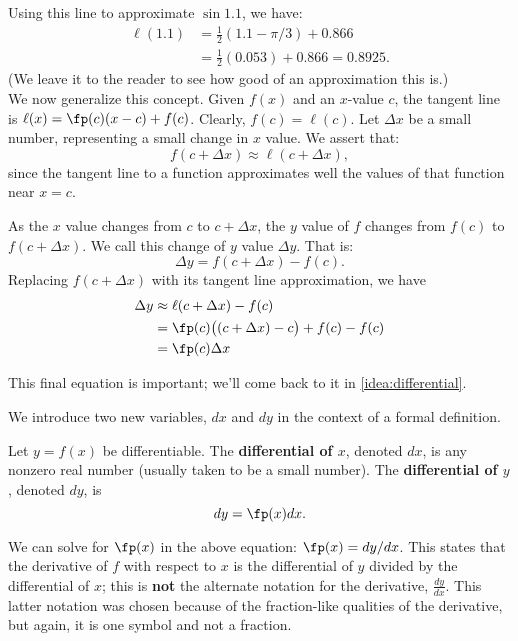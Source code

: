 Using this line to approximate $\sin 1.1$, we have:
\begin{align*}
	\ell(1.1) &= \frac12(1.1-\pi/3)+0.866 \\
					&= \frac12(0.053)+0.866 = 0.8925.
\end{align*}
(We leave it to the reader to see how good of an approximation this is.)\\

We now generalize this concept. Given $f(x)$ and an $x$-value $c$,  the tangent line is $\ell(x) = \fp(c)(x-c)+f(c)$. Clearly, $f(c) = \ell(c)$. Let $\Delta x$ be a small number, representing a small change in $x$ value. We assert that:
\[f(c+\Delta x) \approx \ell(c+\Delta x),\]
since the tangent line to a function approximates well the values of that function near $x=c$. 

As the $x$ value changes from $c$ to $c+\Delta x$, the $y$ value of $f$ changes from $f(c)$ to $f(c+\Delta x)$. We call this change of $y$ value $\Delta y$. That is:
\[\Delta y = f(c+\Delta x)-f(c).\]
Replacing $f(c+\Delta x)$ with its tangent line approximation, we have 
\begin{align}
	\Delta y &\approx \ell(c+\Delta x) - f(c) \notag\\
	&= \fp(c)\bigl((c+\Delta x)-c\bigr)+f(c) - f(c)\notag \\
	&=\fp(c)\Delta x		\label{eq:differential}
\end{align}

This final equation is important; we'll come back to it in \autoref{idea:differential}.

We introduce two new variables, $dx$ and $dy$ in the context of a formal definition. %

\begin{definition}\label{def:differential}
Let $y=f(x)$ be differentiable. The \textbf{differential of $x$}, denoted $dx$, is any nonzero real number (usually taken to be a small number). The \textbf{differential of $y$}, denoted $dy$, is
\[dy = \fp(x)dx.\]
\end{definition}

We can solve for $\fp(x)$ in the above equation: $\fp(x) = dy/dx$. This states that the derivative of $f$ with respect to $x$ is the differential of $y$ divided by the differential of $x$; this is \textbf{not} the alternate notation for the derivative, $\frac{dy}{dx}$. This latter notation was chosen because of the fraction-like qualities of the derivative, but again, it is one symbol and not a fraction.

